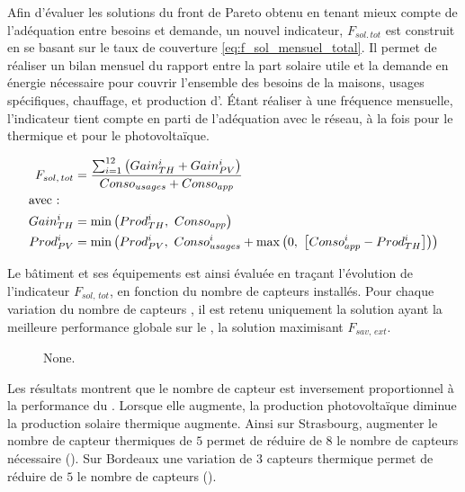Afin d’évaluer les solutions du front de Pareto obtenu en tenant mieux compte de
l’adéquation entre besoins et demande, un nouvel indicateur, $F_{sol.\, tot}$ est construit
en se basant sur le taux de couverture \eqref{eq:f_sol_mensuel_total}. Il permet
de réaliser un bilan mensuel du rapport entre la part solaire utile et la demande en
énergie nécessaire pour couvrir l’ensemble des besoins de la maisons, usages spécifiques,
chauffage, et production d’. Étant réaliser à une fréquence mensuelle, l’indicateur
tient compte en parti de l’adéquation avec le réseau, à la fois pour le thermique et
pour le photovoltaïque.


\begin{align}\label{eq:f_sol_mensuel_total}
        F_{sol,\, tot} &= \frac{\sum_{i=1}^{12}\left(Gain_{TH}^{i} + Gain_{PV}^{i} \right)}{Conso_{usages} + Conso_{app}} \\
        \shortintertext{avec~:}
        Gain_{TH}^{i} &= \min \left(Prod_{TH}^{i},\ Conso_{app} \right) \\
        Prod_{PV}^{i} &= \min \left(Prod_{PV}^{i},\ Conso_{usages}^{i} + \max\left(0,\ \left[Conso_{app}^{i} - Prod_{TH}^{i} \right]\right) \right) \\
\end{align}

Le bâtiment et ses équipements est ainsi évaluée en traçant l’évolution de l’indicateur $F_{sol,\, tot}$,
en fonction du nombre de capteurs  installés. Pour chaque variation du nombre de capteurs ,
il est retenu uniquement la solution ayant la meilleure performance globale sur le , la solution
maximisant $F_{sav,\,ext}$.

\begin{figure}
    \centering
    \caption[None]
             {None.}
    \label{fig:fsoltot_vs_pvnumber}
\end{figure}


Les résultats montrent que le nombre de capteur  est inversement proportionnel
à la performance du . Lorsque elle augmente, la production photovoltaïque
diminue la production solaire thermique augmente. Ainsi sur Strasbourg, augmenter
le nombre de capteur thermiques de $5$ permet de réduire de $8$ le nombre de
capteurs  nécessaire (). Sur Bordeaux une variation de $3$ capteurs
thermique permet de réduire de $5$ le nombre de capteurs  ().

